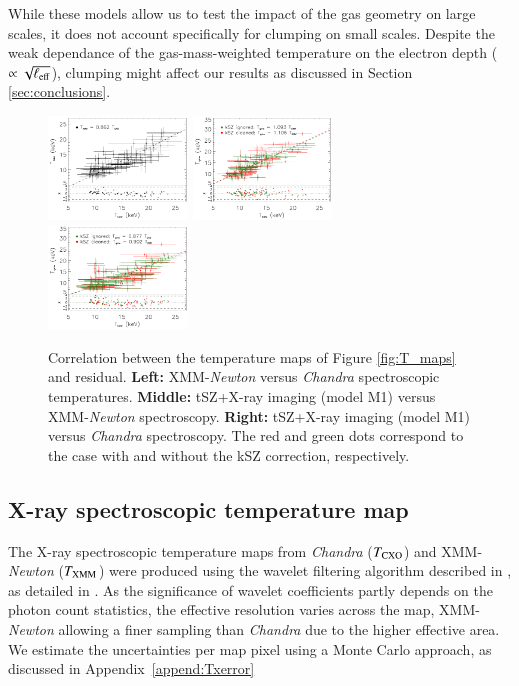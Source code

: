 \documentclass[twocolumn,traditabstract]{aa}
\newcommand{\ccor}[1]{\textcolor{Mypink}{#1}}
\begin{document}
\ccor{While these models allow us to test the impact of the gas geometry on large scales, it does not account specifically for clumping on small scales. Despite the weak dependance of the gas-mass-weighted temperature on the electron depth ($\propto \sqrt{\ell_{\rm eff}}$), clumping might affect our results as discussed in Section \ref{sec:conclusions}.}

\begin{figure}[h]
\centering
\includegraphics[width=0.33\textwidth]{Figure/Thermo_correlation_TXMM-TCXO.pdf}
\includegraphics[width=0.33\textwidth]{Figure/Thermo_correlation_TXMM-TSZ_leff1.pdf}
\includegraphics[width=0.33\textwidth]{Figure/Thermo_correlation_TCXO-TSZ_leff1.pdf}
\caption{\footnotesize{Correlation between the temperature maps of Figure \ref{fig:T_maps} and residual. {\bf Left:} XMM-\textit{Newton} versus \textit{Chandra} spectroscopic temperatures. {\bf Middle:} tSZ+X-ray imaging (model M1) versus XMM-\textit{Newton} spectroscopy. {\bf Right:} tSZ+X-ray imaging (model M1) versus \textit{Chandra} spectroscopy. The red and green dots correspond to the case with and without the kSZ correction, respectively.}}
\label{fig:T_SZ_T_X_correlation}
\end{figure}

\subsection{X-ray spectroscopic temperature map}\label{sec:Xray_spectroscopic_temperature_map}
The X-ray spectroscopic temperature maps from \textit{Chandra} (${T}_{\rm CXO}$) and XMM-\textit{Newton} (${T}_{\rm XMM}$) were produced using the wavelet filtering algorithm described in \cite{Bourdin2008}, as detailed in \cite{Adam2016b}. As the significance of wavelet coefficients partly depends on the photon count statistics, the effective resolution varies across the map, XMM-\textit{Newton} allowing a finer sampling than \textit{Chandra} due to the higher effective area. \ccor{We estimate the uncertainties per map pixel using a Monte Carlo approach, as discussed in Appendix~\ref{append:Txerror}}
\end{document}
